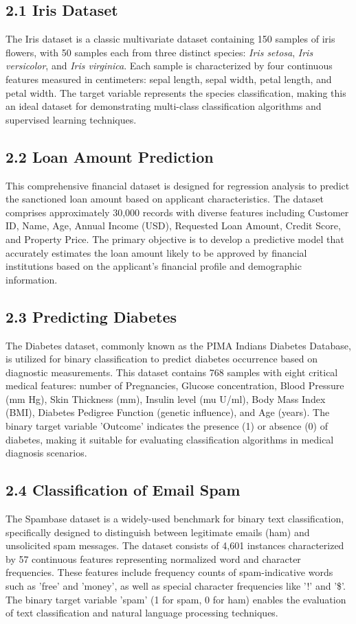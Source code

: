 \documentclass[11pt]{article}
\begin{document}
\subsection*{2.1 Iris Dataset}
The Iris dataset is a classic multivariate dataset containing 150 samples of iris flowers, with 50 samples each from three distinct species: \textit{Iris setosa}, \textit{Iris versicolor}, and \textit{Iris virginica}. Each sample is characterized by four continuous features measured in centimeters: sepal length, sepal width, petal length, and petal width. The target variable represents the species classification, making this an ideal dataset for demonstrating multi-class classification algorithms and supervised learning techniques.

\subsection*{2.2 Loan Amount Prediction}
This comprehensive financial dataset is designed for regression analysis to predict the sanctioned loan amount based on applicant characteristics. The dataset comprises approximately 30,000 records with diverse features including Customer ID, Name, Age, Annual Income (USD), Requested Loan Amount, Credit Score, and Property Price. The primary objective is to develop a predictive model that accurately estimates the loan amount likely to be approved by financial institutions based on the applicant's financial profile and demographic information.

\subsection*{2.3 Predicting Diabetes}
The Diabetes dataset, commonly known as the PIMA Indians Diabetes Database, is utilized for binary classification to predict diabetes occurrence based on diagnostic measurements. This dataset contains 768 samples with eight critical medical features: number of Pregnancies, Glucose concentration, Blood Pressure (mm Hg), Skin Thickness (mm), Insulin level (mu U/ml), Body Mass Index (BMI), Diabetes Pedigree Function (genetic influence), and Age (years). The binary target variable 'Outcome' indicates the presence (1) or absence (0) of diabetes, making it suitable for evaluating classification algorithms in medical diagnosis scenarios.

\subsection*{2.4 Classification of Email Spam}
The Spambase dataset is a widely-used benchmark for binary text classification, specifically designed to distinguish between legitimate emails (ham) and unsolicited spam messages. The dataset consists of 4,601 instances characterized by 57 continuous features representing normalized word and character frequencies. These features include frequency counts of spam-indicative words such as 'free' and 'money', as well as special character frequencies like '!' and '\$'. The binary target variable 'spam' (1 for spam, 0 for ham) enables the evaluation of text classification and natural language processing techniques.
\end{document}
